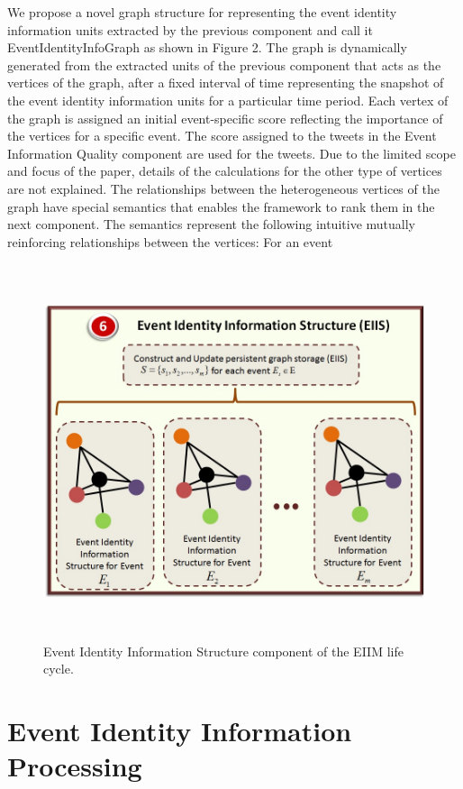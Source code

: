 We propose a novel graph structure for representing the event identity information units extracted by the previous component and call it EventIdentityInfoGraph as shown in Figure 2.  The graph is dynamically generated from the extracted units of the previous component that acts as the vertices of the graph, after a fixed interval of time representing the snapshot of the event identity information units for a particular time period. Each vertex of the graph is assigned an initial event-specific score reflecting the importance of the vertices for a specific event. The score assigned to the tweets in the Event Information Quality component are used for the tweets. Due to the limited scope and focus of the paper, details of the calculations for the other type of vertices are not explained. The relationships between the heterogeneous vertices of the graph have special semantics that enables the framework to rank them in the next component. The semantics represent the following intuitive mutually reinforcing relationships between the vertices:
For an event  


\begin{figure}[htbp]
  \caption{Event Identity Information Structure component of the EIIM life cycle.}
  \centering
    \includegraphics[width=14cm,height=11cm]{Figures/EIIMComponents/EventIdentityInformationStructure.jpg}
\end{figure}



\section{Event Identity Information Processing\label{EventIdentityInformationProcessing}}

